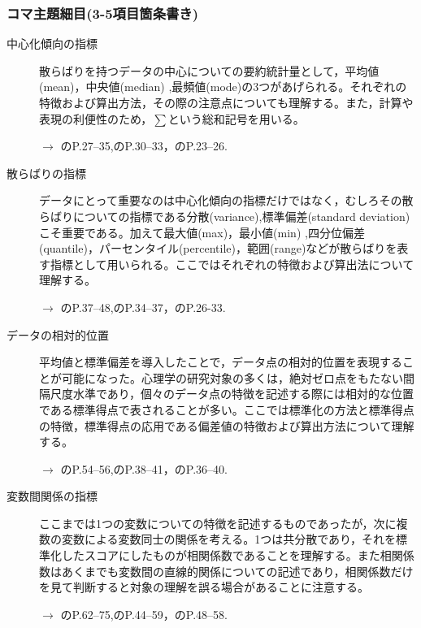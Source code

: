 \subsubsection{コマ主題細目(3-5項目箇条書き)}
\begin{description}
\item[中心化傾向の指標] 散らばりを持つデータの中心についての要約統計量として，平均値(mean)，中央値(median) ,最頻値(mode)の3つがあげられる。それぞれの特徴および算出方法，その際の注意点についても理解する。また，計算や表現の利便性のため，$\sum$という総和記号を用いる。
\begin{flushright}
    $\to$ \citet{山内201001}のP.27--35,\citet{Yamada2004}のP.30--33，\citet{川端201408}のP.23--26.
\end{flushright}

\item[散らばりの指標] データにとって重要なのは中心化傾向の指標だけではなく，むしろその散らばりについての指標である分散(variance),標準偏差(standard deviation)こそ重要である。加えて最大値(max)，最小値(min) ,四分位偏差(quantile)，パーセンタイル(percentile)，範囲(range)などが散らばりを表す指標として用いられる。ここではそれぞれの特徴および算出法について理解する。
\begin{flushright}
    $\to$ \citet{山内201001}のP.37--48,\citet{Yamada2004}のP.34--37，\citet{川端201408}のP.26-33.
\end{flushright}


\item[データの相対的位置]平均値と標準偏差を導入したことで，データ点の相対的位置を表現することが可能になった。心理学の研究対象の多くは，絶対ゼロ点をもたない間隔尺度水準であり，個々のデータ点の特徴を記述する際には相対的な位置である標準得点で表されることが多い。ここでは標準化の方法と標準得点の特徴，標準得点の応用である偏差値の特徴および算出方法について理解する。
\begin{flushright}
    $\to$ \citet{山内201001}のP.54--56,\citet{Yamada2004}のP.38--41，\citet{川端201408}のP.36--40.
\end{flushright}

\item[変数間関係の指標]ここまでは1つの変数についての特徴を記述するものであったが，次に複数の変数による変数同士の関係を考える。1つは共分散であり，それを標準化したスコアにしたものが相関係数であることを理解する。また相関係数はあくまでも変数間の直線的関係についての記述であり，相関係数だけを見て判断すると対象の理解を誤る場合があることに注意する。
\begin{flushright}
    $\to$ \citet{山内201001}のP.62--75,\citet{Yamada2004}のP.44--59，\citet{川端201408}のP.48--58.
\end{flushright}


\end{description}
